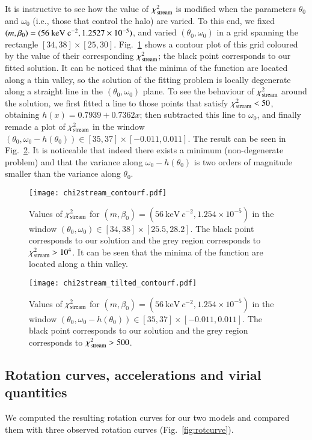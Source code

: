\documentclass[twocolumn]{aa}
\begin{document}
It is instructive to see how the value of $\chi^2_{\rm{stream}}$ is modified when the parameters $\theta_0$ and $\omega_0$ (i.e., those that control the halo) are varied. To this end, we fixed $(m, \beta_0)=(56~\rm{keV}~c^{-2}, 1.2527\times10^{-5})$, and varied $(\theta_0, \omega_0)$ in a grid spanning the rectangle $[34, 38]\times[25, 30]$.
Fig.~\ref{fig:chi2stream} shows a contour plot of this grid coloured by the value of their corresponding $\chi^2_{\rm{stream}}$; the black point corresponds to our fitted solution.
It can be noticed that the minima of the function are located along a thin valley, so the solution of the fitting problem is locally degenerate along a straight line in the $(\theta_0, \omega_0)$ plane.
To see the behaviour of $\chi^2_{\rm{stream}}$ around the solution, we first fitted a line to those points that satisfy $\chi^2_{\rm{stream}}<50$,
obtaining $h(x)= 0.7939+0.7362x$; then subtracted this line to $\omega_0$, and finally remade a plot of $\chi^2_{\rm{stream}}$ in the window $(\theta_0, \omega_0-h(\theta_0))\in[35, 37]\times[-0.011,0.011]$. The result can be seen in Fig.~\ref{fig:chi2stream_tilted}. It is noticeable that indeed there exists a minimum (non-degenerate problem) and that
the variance along $\omega_0-h(\theta_0)$ is two orders of magnitude smaller than the variance along $\theta_0$.
%
\begin{figure}
   \centering
   \texttt{[image: chi2stream\_contourf.pdf]}
   \caption{Values of $\chi^2_{\rm{stream}}$ for $(m, \beta_0)=(56~\mathrm{keV}~c^{-2}, 1.254\times10^{-5})$ in the window $(\theta_0, \omega_0)\in[34, 38]\times[25.5,28.2]$. The black point corresponds to our solution and the grey region corresponds to $\chi^2_{\rm{stream}} >10^4$. It can be seen that the minima of the function are located along a thin valley.}
   \label{fig:chi2stream}
\end{figure}
\begin{figure}
   \centering
   \texttt{[image: chi2stream\_tilted\_contourf.pdf]}
   \caption{Values of $\chi^2_{\rm{stream}}$ for $(m, \beta_0)=(56~\mathrm{keV}~c^{-2}, 1.254\times10^{-5})$ in
   the window $(\theta_0, \omega_0-h(\theta_0))\in[35, 37]\times[-0.011,0.011]$. The black point corresponds to our solution and the grey region corresponds to $\chi^2_{\rm{stream}} > 500 $. }
   \label{fig:chi2stream_tilted}
\end{figure}

\subsection{Rotation curves, accelerations and virial quantities}
We computed the resulting rotation curves for our two models and compared them with three observed rotation curves (Fig.~\ref{fig:rotcurve}).
\end{document}
